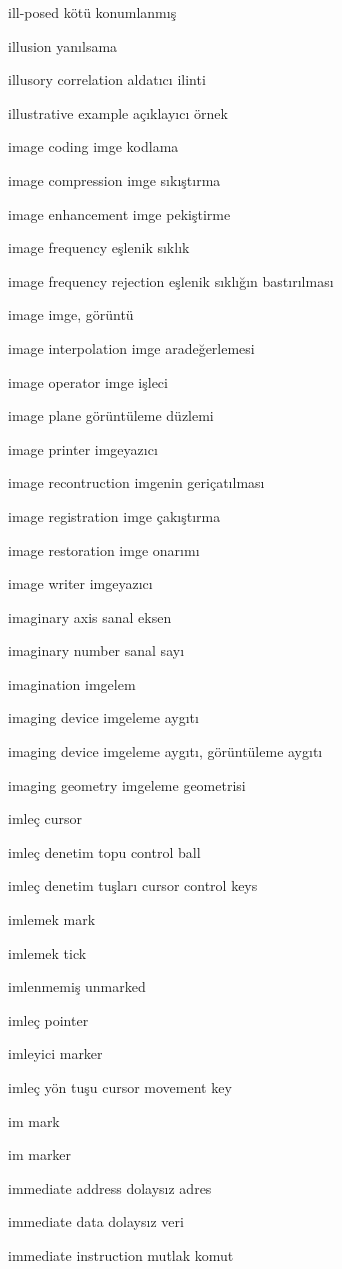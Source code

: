 \documentclass[12pt,fleqn]{article}\usepackage{../../common}
\begin{document}
ill-posed kötü konumlanmış

illusion yanılsama

illusory correlation aldatıcı ilinti

illustrative example açıklayıcı örnek

image coding imge kodlama

image compression imge sıkıştırma

image enhancement imge pekiştirme

image frequency eşlenik sıklık

image frequency rejection eşlenik sıklığın bastırılması

image imge, görüntü

image interpolation imge aradeğerlemesi

image operator imge işleci

image plane görüntüleme düzlemi

image printer imgeyazıcı

image recontruction imgenin geriçatılması

image registration imge çakıştırma

image restoration imge onarımı

image writer imgeyazıcı

imaginary axis sanal eksen

imaginary number sanal sayı

imagination imgelem

imaging device imgeleme aygıtı

imaging device imgeleme aygıtı, görüntüleme aygıtı

imaging geometry imgeleme geometrisi

imleç cursor

imleç denetim topu control ball

imleç denetim tuşları cursor control keys

imlemek mark

imlemek tick

imlenmemiş unmarked

imleç pointer

imleyici marker

imleç yön tuşu cursor movement key

im mark

im marker

immediate address dolaysız adres

immediate data dolaysız veri

immediate instruction mutlak komut
\end{document}
